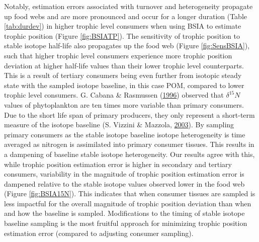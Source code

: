 \documentclass [11pt, proquest] {uwthesis}[2015/03/03]
\begin{document}
Notably, estimation errors associated with turnover and heterogeneity
propagate up food webs and are more pronounced and occur for a longer
duration (Table \ref{tab:durdev}) in higher trophic level consumers when
using BSIA to estimate trophic position (Figure \ref{fig:BSIATP}). The
sensitivity of trophic position to stable isotope half-life also
propagates up the food web (Figure \ref{fig:SensBSIA}), such that higher
trophic level consumers experience more trophic position deviation at
higher half-life values than their lower trophic level counterparts.
This is a result of tertiary consumers being even further from isotopic
steady state with the sampled isotope baseline, in this case POM,
compared to lower trophic level consumers. G. Cabana \& Rasmussen
(\protect\hyperlink{ref-Cabana1996}{1996}) observed that
\(\delta^{15}N\) values of phytoplankton are ten times more variable
than primary consumers. Due to the short life span of primary producers,
they only represent a short-term measure of the isotope baseline (S.
Vizzini \& Mazzola, \protect\hyperlink{ref-Vizzini2003}{2003}). By
sampling primary consumers as the stable isotope baseline isotope
heterogeneity is time averaged as nitrogen is assimilated into primary
consumer tissues. This results in a dampening of baseline stable isotope
heterogeneity. Our results agree with this, while trophic position
estimation error is higher in secondary and tertiary consumers,
variability in the magnitude of trophic position estimation error is
dampened relative to the stable isotope values observed lower in the
food web (Figure \ref{fig:BSIA15N}). This indicates that when consumer
tissues are sampled is less impactful for the overall magnitude of
trophic position deviation than when and how the baseline is sampled.
Modifications to the timing of stable isotope baseline sampling is the
most fruitful approach for minimizing trophic position estimation error
(compared to adjusting consumer sampling).
\end{document}
